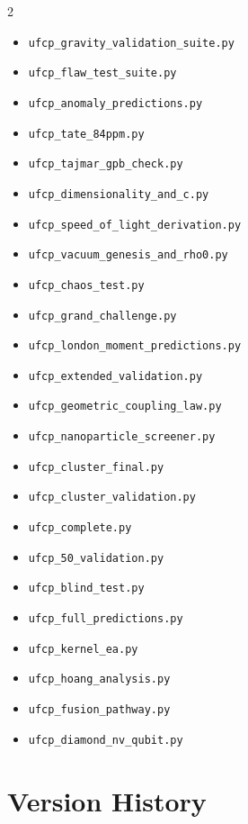 \documentclass[11pt, a4paper]{article}
\begin{document}
\begin{multicols}{2}
\begin{itemize}[nosep, leftmargin=*]
  \item \texttt{ufcp\_gravity\_validation\_suite.py}
  \item \texttt{ufcp\_flaw\_test\_suite.py}
  \item \texttt{ufcp\_anomaly\_predictions.py}
  \item \texttt{ufcp\_tate\_84ppm.py}
  \item \texttt{ufcp\_tajmar\_gpb\_check.py}
  \item \texttt{ufcp\_dimensionality\_and\_c.py}
  \item \texttt{ufcp\_speed\_of\_light\_derivation.py}
  \item \texttt{ufcp\_vacuum\_genesis\_and\_rho0.py}
  \item \texttt{ufcp\_chaos\_test.py}
  \item \texttt{ufcp\_grand\_challenge.py}
  \item \texttt{ufcp\_london\_moment\_predictions.py}
  \item \texttt{ufcp\_extended\_validation.py}
  \item \texttt{ufcp\_geometric\_coupling\_law.py}
  \item \texttt{ufcp\_nanoparticle\_screener.py}
  \item \texttt{ufcp\_cluster\_final.py}
  \item \texttt{ufcp\_cluster\_validation.py}
  \item \texttt{ufcp\_complete.py}
  \item \texttt{ufcp\_50\_validation.py}
  \item \texttt{ufcp\_blind\_test.py}
  \item \texttt{ufcp\_full\_predictions.py}
  \item \texttt{ufcp\_kernel\_ea.py}
  \item \texttt{ufcp\_hoang\_analysis.py}
  \item \texttt{ufcp\_fusion\_pathway.py}
  \item \texttt{ufcp\_diamond\_nv\_qubit.py}
\end{itemize}
\end{multicols}

\section{Version History}
\end{document}
